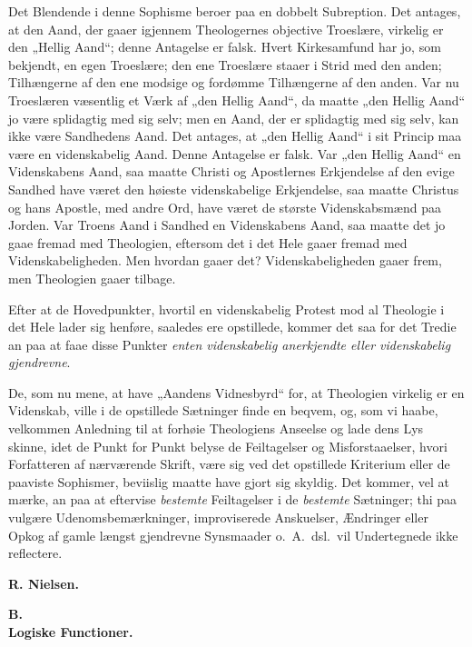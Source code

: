 \documentclass[12pt]{book}
\newcommand{\opage}[1]{\marginnote{\footnotesize\textit{[#1]}}}
\begin{document}
Det Blendende i denne Sophisme beroer paa en dobbelt Subreption. Det antages, at den Aand, der gaaer igjennem Theologernes objective Troeslære, virkelig er den „Hellig Aand“; denne Antagelse er falsk. Hvert Kirkesamfund har jo, som bekjendt, en egen Troeslære; den ene Troeslære staaer i Strid med den anden; Tilhængerne af den ene modsige og fordømme Tilhængerne af den anden. Var nu Troeslæren væsentlig et Værk af „den Hellig Aand“, da maatte „den Hellig Aand“ jo være splidagtig med sig selv; men en Aand, der er splidagtig med sig selv, kan ikke være Sandhedens Aand. Det antages, at „den Hellig Aand“ i sit Princip maa være en videnskabelig Aand. Denne Antagelse er falsk. Var „den Hellig Aand“ en Videnskabens Aand, saa maatte Christi og Apostlernes Erkjendelse af den evige Sandhed have været den høieste videnskabelige Erkjendelse, saa maatte Christus og hans Apostle, med andre Ord, have været de største Videnskabsmænd paa Jorden. Var Troens Aand i Sandhed en Videnskabens Aand, saa maatte det jo gaae fremad med Theologien, eftersom det i det Hele gaaer fremad med Videnskabeligheden. Men hvordan gaaer det? Videnskabeligheden gaaer frem, men Theologien gaaer tilbage.

\opage{XVI}Efter at de Hovedpunkter, hvortil en videnskabelig Protest mod al Theologie i det Hele lader sig henføre, saaledes ere opstillede, kommer det saa for det Tredie an paa at faae disse Punkter \emph{enten videnskabelig anerkjendte eller videnskabelig gjendrevne}.

De, som nu mene, at have „Aandens Vidnesbyrd“ for, at Theologien virkelig er en Videnskab, ville i de opstillede Sætninger finde en beqvem, og, som vi haabe, velkommen Anledning til at forhøie Theologiens Anseelse og lade dens Lys skinne, idet de Punkt for Punkt belyse de Feiltagelser og Misforstaaelser, hvori Forfatteren af nærværende Skrift, være sig ved det opstillede Kriterium eller de paaviste Sophismer, beviislig maatte have gjort sig skyldig. Det kommer, vel at mærke, an paa at eftervise \emph{bestemte} Feiltagelser i de \emph{bestemte} Sætninger; thi paa vulgære Udenomsbemærkninger, improviserede Anskuelser, Ændringer eller Opkog af gamle længst gjendrevne Synsmaader o.\ A.\ dsl.\ vil Undertegnede ikke reflectere.

\bigskip
{}

\begin{flushright}{\bfseries R. Nielsen.}\end{flushright}

\begin{center}
{\large\bfseries B.}\\[3pt]
{\Large\bfseries Logiske Functioner.}
\end{center}
\end{document}
